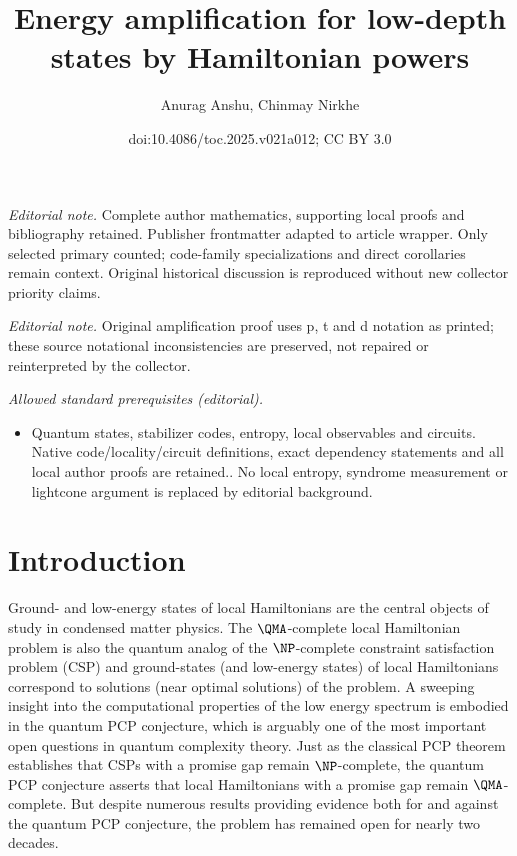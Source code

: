 \documentclass[11pt]{article}
\title{Energy amplification for low-depth states by Hamiltonian powers}
\author{Anurag Anshu, Chinmay Nirkhe}
\date{doi:10.4086/toc.2025.v021a012; CC BY 3.0}
\begin{document}
\maketitle
\noindent\textit{Editorial note.} Complete author mathematics, supporting local proofs and bibliography retained. Publisher frontmatter adapted to article wrapper. Only selected primary counted; code-family specializations and direct corollaries remain context. Original historical discussion is reproduced without new collector priority claims.\par\medskip
\noindent\textit{Editorial note.} Original amplification proof uses p, t and d notation as printed; these source notational inconsistencies are preserved, not repaired or reinterpreted by the collector.\par\medskip
\noindent\textit{Allowed standard prerequisites (editorial).}\begin{itemize}
\item Quantum states, stabilizer codes, entropy, local observables and circuits. Native code/locality/circuit definitions, exact dependency statements and all local author proofs are retained.. No local entropy, syndrome measurement or lightcone argument is replaced by editorial background.
\end{itemize}\medskip
\section{Introduction}

Ground- and low-energy states of local Hamiltonians are the central objects of study in condensed matter physics. The $\QMA$-complete local Hamiltonian problem is also the quantum analog of the $\NP$-complete constraint satisfaction problem (CSP) and ground-states (and low-energy states) of local Hamiltonians correspond to solutions (near optimal solutions) of the problem. A sweeping insight into the computational properties of the low energy spectrum is embodied in the quantum PCP conjecture, which is arguably one of the most important open questions in quantum complexity theory. Just as the classical PCP theorem establishes that CSPs with a promise gap remain $\NP$-complete, the quantum PCP conjecture asserts that local Hamiltonians with a promise gap remain $\QMA$-complete. But despite numerous results providing evidence both for \cite{10.1145/1536414.1536472,10.5555/2600498.2600507,8104078,nirkhe_et_al:LIPIcs:2018:9095,DBLP:conf/focs/NatarajanV18,Eldar2019RobustQE} and against \cite{10.5555/2011637.2011639,10.1145/2488608.2488719,10.1007/s11128-014-0877-9} the quantum PCP conjecture, the problem has remained open for nearly two decades. 
\end{document}
